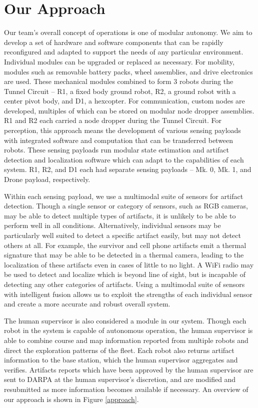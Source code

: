 \section{Our Approach}

Our team's overall concept of operations is one of modular autonomy. We aim to develop a set of hardware and software components that can be rapidly reconfigured and adapted to support the needs of any particular environment. Individual modules can be upgraded or replaced as necessary. For mobility, modules such as removable battery packs, wheel assemblies, and drive electronics are used. These mechanical modules combined to form 3 robots during the Tunnel Circuit -- R1, a fixed body ground robot, R2, a ground robot with a center pivot body, and D1, a hexcopter. For communication, custom nodes are developed, multiples of which can be stored on modular node dropper assemblies. R1 and R2 each carried a node dropper during the Tunnel Circuit. For perception, this approach means the development of various sensing payloads with integrated software and computation that can be transferred between robots. These sensing payloads run modular state estimation and artifact detection and localization software which can adapt to the capabilities of each system. R1, R2, and D1 each had separate sensing payloads -- Mk. 0, Mk. 1, and Drone payload, respectively.

Within each sensing payload, we use a multimodal suite of sensors for artifact detection. Though a single sensor or category of sensors, such as RGB cameras, may be able to detect multiple types of artifacts, it is unlikely to be able to perform well in all conditions. Alternatively, individual sensors may be particularly well suited to detect a specific artifact easily, but may not detect others at all. For example, the survivor and cell phone artifacts emit a thermal signature that may be able to be detected in a thermal camera, leading to the localization of these artifacts even in cases of little to no light. A WiFi radio may be used to detect and localize which is beyond line of sight, but is incapable of detecting any other categories of artifacts. Using a multimodal suite of sensors with intelligent fusion allows us to exploit the strengths of each individual sensor and create a more accurate and robust overall system.

The human supervisor is also considered a module in our system. Though each robot in the system is capable of autonomous operation, the human supervisor is able to combine course and map information reported from multiple robots and direct the exploration patterns of the fleet. Each robot also returns artifact information to the base station, which the human supervisor aggregates and verifies. Artifacts reports which have been approved by the human supervisor are sent to DARPA at the human supervisor's discretion, and are modified and resubmitted as more information becomes available if necessary. An overview of our approach is shown in Figure \ref{approach}.

